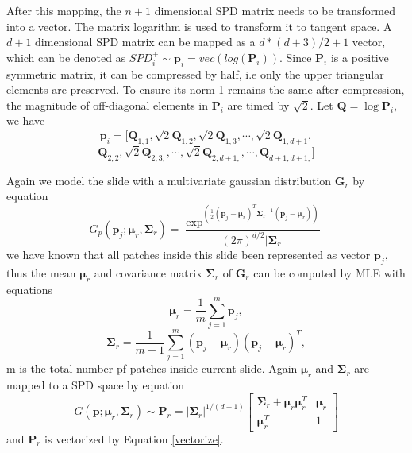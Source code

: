 After this mapping, the $n+1$ dimensional SPD matrix needs to be transformed into a vector. The matrix logarithm is used to transform it to tangent space. A $d+1$ dimensional SPD matrix can be mapped as a $d*(d+3)/2+1$ vector, which can be denoted as $SPD_i^+ \sim \bm{p}_i = vec(log(\bm{P}_i))$. Since $\bm{P}_i$ is a positive symmetric matrix, it can be compressed by half, i.e only the upper triangular elements are preserved. To ensure its norm-1 remains the same after compression, the magnitude of off-diagonal elements in $\bm{P}_i$ are timed by $\sqrt2$.  Let $\bm{Q}=\log{\bm{P}_i}$, we have
\begin{equation}\label{vectorize}
 \bm{p}_i = [\bm{Q}_{1,1},\sqrt2\bm{Q}_{1,2},\sqrt2\bm{Q}_{1,3},\cdots,\sqrt2\bm{Q}_{1,d+1},
 \end{equation}
 \begin{equation}
 \bm{Q}_{2,2},\sqrt2\bm{Q}_{2,3,},\cdots,\sqrt2\bm{Q}_{2,d+1,},\cdots,\bm{Q}_{d+1,d+1,}]
\end{equation}


Again we model the slide with a multivariate gaussian distribution $\bm{G}_r$ by equation
\begin{equation}
G_p(\bm{p}_j;\bm{\mu}_r,\bm{\Sigma}_r) = \frac{\exp^{(\frac{1}{2}(\bm{p}_j-\bm{\mu}_r)^T\bm{\Sigma_r}^{-1}(\bm{p}_j-\bm{\mu}_r))}}{(2\pi)^{d/2}|{\bm{\Sigma}_r|}} 
\end{equation}
we have known that all patches inside this slide been represented as vector $\bm{p}_j$, thus the mean $\bm{\mu}_r$ and covariance matrix ${\bm{\Sigma}}_r$ of $\bm{G}_r$ can be computed by MLE with equations
\begin{equation}
\bm{\mu}_r = \frac{1}{m}\sum_{j = 1}^m \bm{p}_j,
\end{equation}
\begin{equation}
\bm{\Sigma}_r = \frac{1}{m -1} \sum_{j = 1}^m(\bm{p}_j-\bm{\mu}_r)(\bm{p}_j-\bm{\mu}_r)^T,
\end{equation}
m is the total number pf patches inside current slide. Again $\bm{\mu}_r$ and $\bm{\Sigma}_r$ are mapped to a SPD space by equation
\begin{equation}
G(\bm{p};\bm{\mu}_r,\bm{\Sigma}_r) \sim \bm{P}_r  = |\bm{\Sigma}_r|^{1/(d+1)} \left[ \begin{matrix}
\bm{\Sigma}_r + \bm{\mu}_r\bm{\mu}_r^T & \bm{\mu}_r \\
\bm{\mu}_r^T & 1
\end{matrix}
\right]
\end{equation}
and $\bm{P}_r$ is vectorized by Equation \ref{vectorize}.


